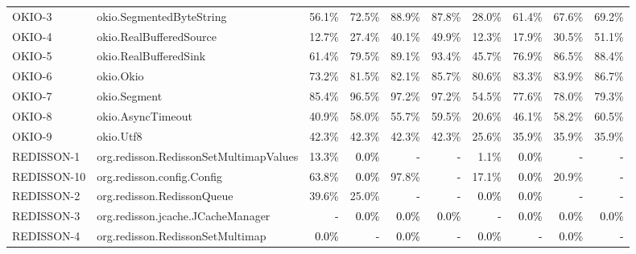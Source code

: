 \begin{tabular}{ ll rrrr rrrr}
OKIO-3  &  okio.SegmentedByteString & 56.1\% & 72.5\% & 88.9\% & 87.8\% & 28.0\% & 61.4\% & 67.6\% & 69.2\%\\ 
OKIO-4  &  okio.RealBufferedSource & 12.7\% & 27.4\% & 40.1\% & 49.9\% & 12.3\% & 17.9\% & 30.5\% & 51.1\%\\ 
OKIO-5  &  okio.RealBufferedSink & 61.4\% & 79.5\% & 89.1\% & 93.4\% & 45.7\% & 76.9\% & 86.5\% & 88.4\%\\ 
OKIO-6  &  okio.Okio & 73.2\% & 81.5\% & 82.1\% & 85.7\% & 80.6\% & 83.3\% & 83.9\% & 86.7\%\\ 
OKIO-7  &  okio.Segment & 85.4\% & 96.5\% & 97.2\% & 97.2\% & 54.5\% & 77.6\% & 78.0\% & 79.3\%\\ 
OKIO-8  &  okio.AsyncTimeout & 40.9\% & 58.0\% & 55.7\% & 59.5\% & 20.6\% & 46.1\% & 58.2\% & 60.5\%\\ 
OKIO-9  &  okio.Utf8 & 42.3\% & 42.3\% & 42.3\% & 42.3\% & 25.6\% & 35.9\% & 35.9\% & 35.9\%\\ 
REDISSON-1  &  org.redisson.RedissonSetMultimapValues & 13.3\% & \cellcolor{light-gray} \textcolor{black}{0.0\%} & \cellcolor{light-gray} \textcolor{black}{-} & \cellcolor{light-gray} \textcolor{black}{-} & 1.1\% & \cellcolor{light-gray} \textcolor{black}{0.0\%} & \cellcolor{light-gray} \textcolor{black}{-} & \cellcolor{light-gray} \textcolor{black}{-}\\ 
REDISSON-10  &  org.redisson.config.Config & 63.8\% & \cellcolor{light-gray} \textcolor{black}{0.0\%} & 97.8\% & \cellcolor{light-gray} \textcolor{black}{-} & 17.1\% & \cellcolor{light-gray} \textcolor{black}{0.0\%} & 20.9\% & \cellcolor{light-gray} \textcolor{black}{-}\\ 
REDISSON-2  &  org.redisson.RedissonQueue & 39.6\% & 25.0\% & \cellcolor{light-gray} \textcolor{black}{-} & \cellcolor{light-gray} \textcolor{black}{-} & \cellcolor{light-gray} \textcolor{black}{0.0\%} & \cellcolor{light-gray} \textcolor{black}{0.0\%} & \cellcolor{light-gray} \textcolor{black}{-} & \cellcolor{light-gray} \textcolor{black}{-}\\ 
REDISSON-3  &  org.redisson.jcache.JCacheManager & \cellcolor{light-gray} \textcolor{black}{-} & \cellcolor{light-gray} \textcolor{black}{0.0\%} & \cellcolor{light-gray} \textcolor{black}{0.0\%} & \cellcolor{light-gray} \textcolor{black}{0.0\%} & \cellcolor{light-gray} \textcolor{black}{-} & \cellcolor{light-gray} \textcolor{black}{0.0\%} & \cellcolor{light-gray} \textcolor{black}{0.0\%} & \cellcolor{light-gray} \textcolor{black}{0.0\%}\\ 
REDISSON-4  &  org.redisson.RedissonSetMultimap & \cellcolor{light-gray} \textcolor{black}{0.0\%} & \cellcolor{light-gray} \textcolor{black}{-} & \cellcolor{light-gray} \textcolor{black}{0.0\%} & \cellcolor{light-gray} \textcolor{black}{-} & \cellcolor{light-gray} \textcolor{black}{0.0\%} & \cellcolor{light-gray} \textcolor{black}{-} & \cellcolor{light-gray} \textcolor{black}{0.0\%} & \cellcolor{light-gray} \textcolor{black}{-}\\ 

\end{tabular}
